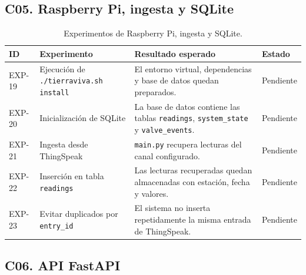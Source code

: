 \subsection{C05. Raspberry Pi, ingesta y SQLite}

\begin{table}[H]
\centering
\renewcommand{\arraystretch}{1.2}
\scriptsize
\begin{tabular}{|p{}|p{}|p{}|p{}|}
\hline
\rowcolor{gray!20}
\textbf{ID} & \textbf{Experimento} & \textbf{Resultado esperado} & \textbf{Estado} \\
\hline
EXP-19 & Ejecución de \texttt{./tierraviva.sh install} & El entorno virtual, dependencias y base de datos quedan preparados. & Pendiente \\
\hline
EXP-20 & Inicialización de SQLite & La base de datos contiene las tablas \texttt{readings}, \texttt{system\_state} y \texttt{valve\_events}. & Pendiente \\
\hline
EXP-21 & Ingesta desde ThingSpeak & \texttt{main.py} recupera lecturas del canal configurado. & Pendiente \\
\hline
EXP-22 & Inserción en tabla \texttt{readings} & Las lecturas recuperadas quedan almacenadas con estación, fecha y valores. & Pendiente \\
\hline
EXP-23 & Evitar duplicados por \texttt{entry\_id} & El sistema no inserta repetidamente la misma entrada de ThingSpeak. & Pendiente \\
\hline
\end{tabular}
\caption{Experimentos de Raspberry Pi, ingesta y SQLite.}
\label{tab:exp_raspberry_sqlite}
\end{table}

\subsection{C06. API FastAPI}

